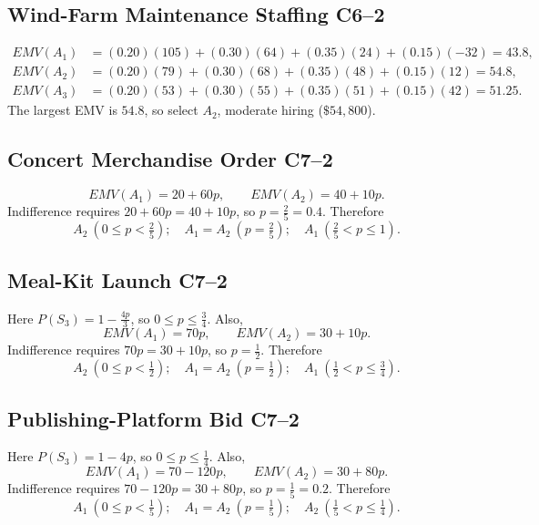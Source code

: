 \subsection{Wind-Farm Maintenance Staffing \hfill C6--2}
\begin{align*}EMV(A_1)&=(0.20)(105)+(0.30)(64)+(0.35)(24)+(0.15)(-32)=43.8,\\ EMV(A_2)&=(0.20)(79)+(0.30)(68)+(0.35)(48)+(0.15)(12)=54.8,\\ EMV(A_3)&=(0.20)(53)+(0.30)(55)+(0.35)(51)+(0.15)(42)=51.25.\end{align*}
The largest EMV is $54.8$, so select $\boxed{A_2}$, moderate hiring ($\$54{,}800$).

\subsection{Concert Merchandise Order \hfill C7--2}
\[
EMV(A_1)=20+60p,\qquad EMV(A_2)=40+10p.
\]
Indifference requires $20+60p=40+10p$, so $p=\frac25=0.4$. Therefore
\[
\boxed{A_2\ (0\le p<\tfrac25);\quad A_1=A_2\ (p=\tfrac25);\quad A_1\ (\tfrac25<p\le1).}
\]

\subsection{Meal-Kit Launch \hfill C7--2}
Here $P(S_3)=1-\frac{4p}{3}$, so $0\le p\le\frac34$. Also,
\[
EMV(A_1)=70p,\qquad EMV(A_2)=30+10p.
\]
Indifference requires $70p=30+10p$, so $p=\frac12$. Therefore
\[
\boxed{A_2\ (0\le p<\tfrac12);\quad A_1=A_2\ (p=\tfrac12);\quad A_1\ (\tfrac12<p\le\tfrac34).}
\]

\subsection{Publishing-Platform Bid \hfill C7--2}
Here $P(S_3)=1-4p$, so $0\le p\le\frac14$. Also,
\[
EMV(A_1)=70-120p,\qquad EMV(A_2)=30+80p.
\]
Indifference requires $70-120p=30+80p$, so $p=\frac15=0.2$. Therefore
\[
\boxed{A_1\ (0\le p<\tfrac15);\quad A_1=A_2\ (p=\tfrac15);\quad A_2\ (\tfrac15<p\le\tfrac14).}
\]


